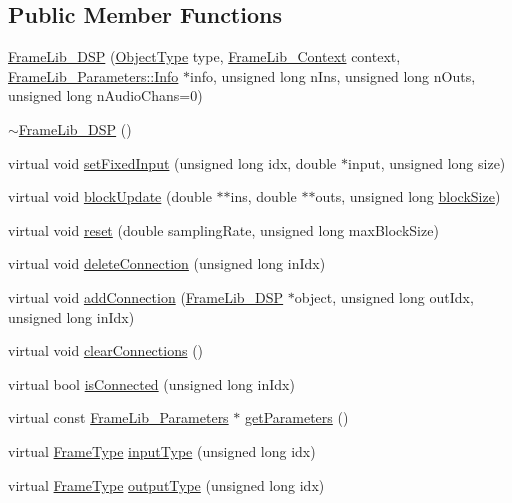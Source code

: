 \subsection*{Public Member Functions}
\begin{DoxyCompactItemize}
\item 
\hyperlink{class_frame_lib___d_s_p_a404abe3f4d147a34a16e9b2077b66dd9}{Frame\+Lib\+\_\+\+D\+SP} (\hyperlink{_frame_lib___types_8h_a842c5e2e69277690b064bf363c017980}{Object\+Type} type, \hyperlink{class_frame_lib___context}{Frame\+Lib\+\_\+\+Context} context, \hyperlink{class_frame_lib___parameters_1_1_info}{Frame\+Lib\+\_\+\+Parameters\+::\+Info} $\ast$info, unsigned long n\+Ins, unsigned long n\+Outs, unsigned long n\+Audio\+Chans=0)
\item 
\hyperlink{class_frame_lib___d_s_p_a2cf489678b72fe7e46956e69fac182ed}{$\sim$\+Frame\+Lib\+\_\+\+D\+SP} ()
\item 
virtual void \hyperlink{class_frame_lib___d_s_p_ad15333614446257796e75db254efac78}{set\+Fixed\+Input} (unsigned long idx, double $\ast$input, unsigned long size)
\item 
virtual void \hyperlink{class_frame_lib___d_s_p_aafa57c93417ced3d5610ca9f6b0f0913}{block\+Update} (double $\ast$$\ast$ins, double $\ast$$\ast$outs, unsigned long \hyperlink{_frame_lib___memory_8cpp_a8ef7d53a4cac28bf580a61f265fcaaa6}{block\+Size})
\item 
virtual void \hyperlink{class_frame_lib___d_s_p_ad253c096a1c7cc236804dfd1f2e650ec}{reset} (double sampling\+Rate, unsigned long max\+Block\+Size)
\item 
virtual void \hyperlink{class_frame_lib___d_s_p_ad828d2b359466e9ff2f0f6002d580d18}{delete\+Connection} (unsigned long in\+Idx)
\item 
virtual void \hyperlink{class_frame_lib___d_s_p_a835fc24bc4224279fa53b15bde7a824f}{add\+Connection} (\hyperlink{class_frame_lib___d_s_p}{Frame\+Lib\+\_\+\+D\+SP} $\ast$object, unsigned long out\+Idx, unsigned long in\+Idx)
\item 
virtual void \hyperlink{class_frame_lib___d_s_p_a42ab6ff22056a188a33ecadcd2ea477d}{clear\+Connections} ()
\item 
virtual bool \hyperlink{class_frame_lib___d_s_p_a6c0e00484c67ea160cf87ec644807cac}{is\+Connected} (unsigned long in\+Idx)
\item 
virtual const \hyperlink{class_frame_lib___parameters}{Frame\+Lib\+\_\+\+Parameters} $\ast$ \hyperlink{class_frame_lib___d_s_p_ac871e4980da27cbd5238b8780a357217}{get\+Parameters} ()
\item 
virtual \hyperlink{_frame_lib___types_8h_ad495a9f61af7fff07d7e97979d1ab854}{Frame\+Type} \hyperlink{class_frame_lib___d_s_p_abbd266dacec0eb86acaf584f737338b7}{input\+Type} (unsigned long idx)
\item 
virtual \hyperlink{_frame_lib___types_8h_ad495a9f61af7fff07d7e97979d1ab854}{Frame\+Type} \hyperlink{class_frame_lib___d_s_p_aaffa4da5531641a7da9f85e93d3440f0}{output\+Type} (unsigned long idx)
\end{DoxyCompactItemize}
